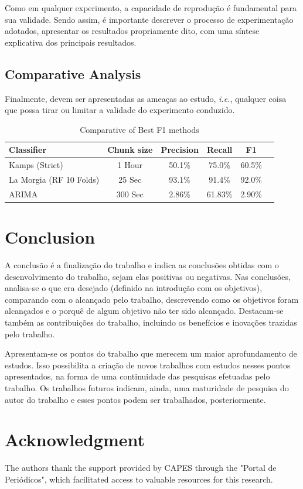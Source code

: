 \documentclass[12pt]{article}
\begin{document}
	Como em qualquer experimento, a capacidade de reprodução é fundamental para sua validade.
	Sendo assim, é importante descrever o processo de experimentação adotados, apresentar os resultados propriamente dito, com uma síntese explicativa dos principais resultados.

	\subsection{Comparative Analysis}
	\label{subsec_result_comparing}
	Finalmente, devem ser apresentadas as ameaças ao estudo, \emph{i.e.}, qualquer coisa que possa tirar ou limitar a validade do experimento conduzido.

	\begin{table}[!ht]
        \centering
        \caption{Comparative of Best F1 methods}
        \begin{tabular}{lccccc}
            \toprule
            \textbf{Classifier} & \textbf{Chunk size} & \textbf{Precision} & \textbf{Recall} & \textbf{F1} \\
            \midrule
            Kamps (Strict) & 1 Hour & 50.1\% & 75.0\% & 60.5\% \\
            La Morgia (RF 10 Folds) & 25 Sec & 93.1\% & 91.4\% & 92.0\% \\
            ARIMA & 300 Sec & 2.86\% & 61.83\% & 2.90\% \\
            \bottomrule
        \end{tabular}
        \label{tab_comparison}
    \end{table}
	
	\section{Conclusion}
	\label{sec_conclusao}
	
	A conclusão é a finalização do trabalho e indica as conclusões obtidas com o desenvolvimento do trabalho, sejam elas positivas ou negativas. Nas conclusões, analisa-se o que era desejado (definido na introdução com os objetivos), comparando com o alcançado pelo trabalho, descrevendo como os objetivos foram alcançados e o porquê de algum objetivo não ter sido alcançado. Destacam-se também as contribuições do trabalho, incluindo os benefícios e inovações trazidas pelo trabalho.
	
	Apresentam-se os pontos do trabalho que merecem um maior aprofundamento de estudos. Isso possibilita a criação de novos trabalhos com estudos nesses pontos apresentados, na forma de uma continuidade das pesquisas efetuadas pelo trabalho. Os trabalhos futuros indicam, ainda, uma maturidade de pesquisa do autor do trabalho e esses pontos podem ser trabalhados, posteriormente.
	
	\section*{Acknowledgment}
	The authors thank the support provided by CAPES through the "Portal de Periódicos", which facilitated access to valuable resources for this research.
	
    
	
	
\end{document}
